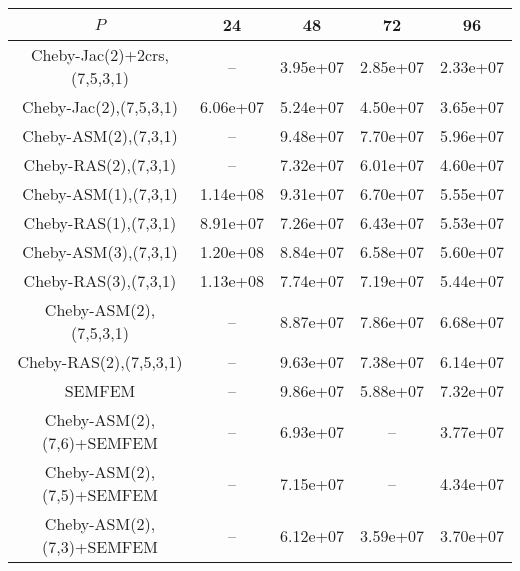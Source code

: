 \begin{table*}
\centering
\begin{tabular}{||c||cccc||}
	\hline
	$P$ & 24 & 48 & 72 & 96 \\
	\hline\hline
	Cheby-Jac(2)+2crs,(7,5,3,1)	&	 --	&	3.95e+07	&	2.85e+07	&	2.33e+07\\
	Cheby-Jac(2),(7,5,3,1)	&	6.06e+07	&	5.24e+07	&	4.50e+07	&	3.65e+07\\
	Cheby-ASM(2),(7,3,1)	&	 --	&	9.48e+07	&	7.70e+07	&	5.96e+07\\
	Cheby-RAS(2),(7,3,1)	&	 --	&	7.32e+07	&	6.01e+07	&	4.60e+07\\
	Cheby-ASM(1),(7,3,1)	&	1.14e+08	&	9.31e+07	&	6.70e+07	&	5.55e+07\\
	Cheby-RAS(1),(7,3,1)	&	8.91e+07	&	7.26e+07	&	6.43e+07	&	5.53e+07\\
	Cheby-ASM(3),(7,3,1)	&	1.20e+08	&	8.84e+07	&	6.58e+07	&	5.60e+07\\
	Cheby-RAS(3),(7,3,1)	&	1.13e+08	&	7.74e+07	&	7.19e+07	&	5.44e+07\\
	Cheby-ASM(2),(7,5,3,1)	&	 --	&	8.87e+07	&	7.86e+07	&	6.68e+07\\
	Cheby-RAS(2),(7,5,3,1)	&	 --	&	9.63e+07	&	7.38e+07	&	6.14e+07\\
	SEMFEM	&	 --	&	9.86e+07	&	5.88e+07	&	7.32e+07\\
	Cheby-ASM(2),(7,6)+SEMFEM	&	 --	&	6.93e+07	&	 --	&	3.77e+07\\
	Cheby-ASM(2),(7,5)+SEMFEM	&	 --	&	7.15e+07	&	 --	&	4.34e+07\\
	Cheby-ASM(2),(7,3)+SEMFEM	&	 --	&	6.12e+07	&	3.59e+07	&	3.70e+07\\
\hline
\end{tabular}
\caption{\label{table:foobar}}
\end{table*}
